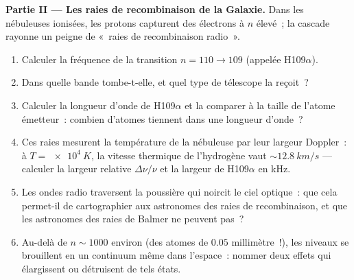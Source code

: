 \begin{problem}
\medskip\noindent\textbf{Partie II --- Les raies de recombinaison de
la Galaxie.}
Dans les nébuleuses ionisées, les protons capturent des électrons à
$n$ élevé~; la cascade rayonne un peigne de «~raies de recombinaison
radio~».
\begin{enumerate}[resume]
  \item Calculer la fréquence de la transition $n = 110 \to 109$
        (appelée H109$\alpha$).
  \item Dans quelle bande tombe-t-elle, et quel type de télescope la
        reçoit~?
  \item Calculer la longueur d'onde de H109$\alpha$ et la comparer à
        la taille de l'atome émetteur~: combien d'atomes tiennent
        dans une longueur d'onde~?
  \item Ces raies mesurent la température de la nébuleuse par leur
        largeur Doppler~: à $T = \qty{e4}{K}$, la vitesse thermique
        de l'hydrogène vaut $\sim\qty{12.8}{km/s}$ --- calculer la
        largeur relative $\Delta\nu/\nu$ et la largeur de
        H109$\alpha$ en kHz.
  \item Les ondes radio traversent la poussière qui noircit le ciel
        optique~: que cela permet-il de cartographier aux astronomes
        des raies de recombinaison, et que les astronomes des raies
        de Balmer ne peuvent pas~?
  \item Au-delà de $n \sim 1000$ environ (des atomes de $0.05$
        millimètre~!), les niveaux se brouillent en un continuum même
        dans l'espace~: nommer deux effets qui élargissent ou
        détruisent de tels états.
\end{enumerate}


\end{problem}
